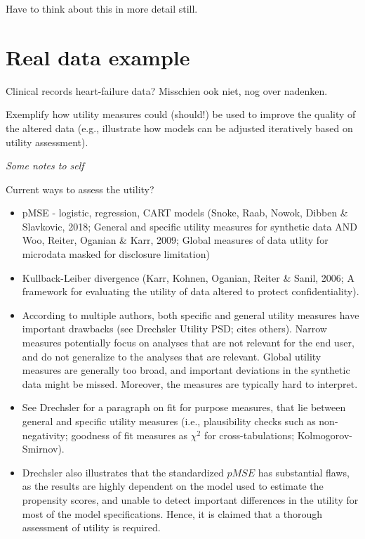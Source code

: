 \documentclass[
]{article}
\begin{document}
Have to think about this in more detail still.

\hypertarget{real-data-example}{%
\section{Real data example}\label{real-data-example}}

Clinical records heart-failure data? Misschien ook niet, nog over
nadenken.

Exemplify how utility measures could (should!) be used to improve the
quality of the altered data (e.g., illustrate how models can be adjusted
iteratively based on utility assessment).

\emph{Some notes to self}

Current ways to assess the utility?

\begin{itemize}
\item
  pMSE - logistic, regression, CART models (Snoke, Raab, Nowok, Dibben
  \& Slavkovic, 2018; General and specific utility measures for
  synthetic data AND Woo, Reiter, Oganian \& Karr, 2009; Global measures
  of data utlity for microdata masked for disclosure limitation)
\item
  Kullback-Leiber divergence (Karr, Kohnen, Oganian, Reiter \& Sanil,
  2006; A framework for evaluating the utility of data altered to
  protect confidentiality).
\item
  According to multiple authors, both specific and general utility
  measures have important drawbacks (see Drechsler Utility PSD; cites
  others). Narrow measures potentially focus on analyses that are not
  relevant for the end user, and do not generalize to the analyses that
  are relevant. Global utility measures are generally too broad, and
  important deviations in the synthetic data might be missed. Moreover,
  the measures are typically hard to interpret.
\item
  See Drechsler for a paragraph on fit for purpose measures, that lie
  between general and specific utility measures (i.e., plausibility
  checks such as non-negativity; goodness of fit measures as \(\chi^2\)
  for cross-tabulations; Kolmogorov-Smirnov).
\item
  Drechsler also illustrates that the standardized \(pMSE\) has
  substantial flaws, as the results are highly dependent on the model
  used to estimate the propensity scores, and unable to detect important
  differences in the utility for most of the model specifications.
  Hence, it is claimed that a thorough assessment of utility is
  required.
\end{itemize}
\end{document}
